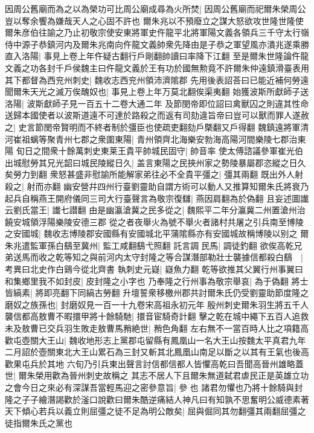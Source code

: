 因周公舊廟而為之以為榮功可比周公廟成尋為火所焚|{
	因周公舊廟而祀爾朱榮周公豈以奪余饗為嫌哉天人之心固不許也}
爾朱兆以不預廢立之謀大怒欲攻世隆世隆使爾朱彦伯往諭之乃止初敬宗使安東將軍史仵龍平北將軍陽文義各領兵三千守太行嶺侍中源子恭鎮河内及爾朱兆南向仵龍文義帥衆先降由是子恭之軍望風亦潰兆遂乘勝直入洛陽|{
	事見上卷上年仵疑古翻行戶剛翻帥讀曰率降下江翻}
至是爾朱世隆論仵龍文義之功各封千戶侯魏主曰仵龍文義於王有功於國無勲竟不許爾朱仲遠鎮滑臺表用其下都督為西兖州刺史|{
	魏收志西兖州領沛濟隂郡}
先用後表詔荅曰已能近補何勞遠聞爾朱天光之滅万俟醜奴也|{
	事見上卷上年万莫北翻俟渠夷翻}
始獲波斯所獻師子送洛陽|{
	波斯獻師子見一百五十二卷大通二年}
及節閔帝即位詔曰禽獸囚之則違其性命送歸本國使者以波斯道遠不可達於路殺之而返有司劾違旨帝曰豈可以獸而罪人遂赦之|{
	史言節閔帝賢明而不終者制於彊臣也使疏吏翻劾戶槩翻又戶得翻}
魏鎮遠將軍清河崔祖螭等聚青州七郡之衆圍東陽|{
	青州領齊北海樂安勃海高陽河間樂陵七郡治東陽}
旬日之間衆十餘萬刺史東莱王貴平帥城民固守|{
	帥音率}
使太傅諮議參軍崔光伯出城慰勞其兄光韶曰城民陵縱日久|{
	盖言東陽之民挾州家之勢陵暴屬郡恣縱之日久矣勞力到翻}
衆怒甚盛非慰諭所能解家弟往必不全貴平彊之|{
	彊其兩翻}
既出外人射殺之|{
	射而亦翻}
幽安營幷四州行臺劉靈助自謂方術可以動人又推算知爾朱氏將衰乃起兵自稱燕王開府儀同三司大行臺聲言為敬宗復讎|{
	燕因肩翻為於偽翻}
且妄述圖䜟云劉氏當王|{
	䜟七譛翻}
由是幽瀛滄冀之民多從之|{
	魏熙平二年分瀛冀二州置滄州治饒安城領浮陽樂陵安德三郡}
從之者夜舉火為號不舉火者諸村共屠之引兵南至博陵之安國城|{
	魏收志博陵郡安國縣有安國城北平蒲隂縣亦有安國城故稱博陵以别之}
爾朱兆遣監軍孫白鷂至冀州|{
	監工咸翻鷂弋照翻}
託言調民馬|{
	調徒釣翻}
欲俟高乾兄弟送馬而收之乾等知之與前河内太守封隆之等合謀潛部勒壯士襲據信都殺白鷂　|{
	考異曰北史作白鷄今從北齊書}
執刺史元嶷|{
	嶷魚力翻}
乾等欲推其父翼行州事翼曰和集鄉里我不如封皮|{
	皮封隆之小字也}
乃奉隆之行州事為敬宗舉哀|{
	為于偽翻}
將士皆縞素|{
	將即亮翻下同縞古勞翻}
升壇誓衆移檄州郡共討爾朱氏仍受劉靈助節度隆之磨奴之族孫也|{
	封磨奴見一百一十九卷宋高祖永初元年}
殷州刺史爾朱羽生將五千人襲信都高敖曹不暇擐甲將十餘騎馳|{
	擐音宦騎奇計翻}
擊之乾在城中繩下五百人追救未及敖曹已交兵羽生敗走敖曹馬矟絶世|{
	矟色角翻}
左右無不一當百時人比之項籍高歡屯壺關大王山|{
	魏收地形志上黨郡屯留縣有鳳凰山一名大王山按魏太平真君九年二月詔於壺關東北大王山累石為三封又斬其北鳳凰山南足以斷之以其有王氣也後高歡果屯兵於其地}
六旬乃引兵東出聲言討信都信都人皆懼高乾曰吾聞高晉州雄略蓋世|{
	爾朱榮用歡為晉州刺史故稱之}
其志不居人下且爾朱無道弑君虐民正是英雄立功之會今日之來必有深謀吾當輕馬迎之密參意旨|{
	參也}
諸君勿懼也乃將十餘騎與封隆之子子繪潛謁歡於滏口說歡曰爾朱酷逆痛結人神凡曰有知孰不思奮明公威德素著天下傾心若兵以義立則屈彊之徒不足為明公敵矣|{
	屈與倔同其勿翻彊其兩翻屈彊之徒指爾朱氏之黨也}
